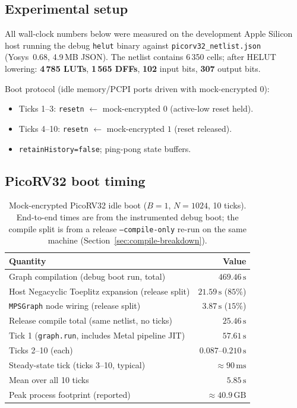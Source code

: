 \documentclass[11pt,a4paper]{article}
\begin{document}
\subsection{Experimental setup}

All wall-clock numbers below were measured on the development Apple Silicon host
running the debug \texttt{helut} binary against
\texttt{picorv32\_netlist.json} (Yosys~0.68, 4.9\,MB JSON).
The netlist contains 6\,350 cells; after HELUT lowering:
\textbf{4\,785 LUTs}, \textbf{1\,565 DFFs}, \textbf{102} input bits,
\textbf{307} output bits.

Boot protocol (idle memory/PCPI ports driven with mock-encrypted 0):
\begin{itemize}[leftmargin=*,itemsep=1pt]
  \item Ticks 1--3: \texttt{resetn} $\leftarrow$ mock-encrypted $0$ (active-low reset held).
  \item Ticks 4--10: \texttt{resetn} $\leftarrow$ mock-encrypted $1$ (reset released).
  \item \texttt{retainHistory=false}; ping-pong state buffers.
\end{itemize}

\subsection{PicoRV32 boot timing}
\label{sec:timing}

\begin{table}[t]
\centering
\caption{Mock-encrypted PicoRV32 idle boot ($B=1$, $N=1024$, 10 ticks).
End-to-end times are from the instrumented debug boot; the compile split is from
a release \texttt{--compile-only} re-run on the same machine
(Section~\ref{sec:compile-breakdown}).}
\label{tab:boot}
\begin{tabular}{@{}lr@{}}
\toprule
\textbf{Quantity} & \textbf{Value} \\
\midrule
Graph compilation (debug boot run, total)
  & $469.46\,\mathrm{s}$ \\
\quad Host Negacyclic Toeplitz expansion (release split)
  & $21.59\,\mathrm{s}$ ($85\%$) \\
\quad \texttt{MPSGraph} node wiring (release split)
  & $3.87\,\mathrm{s}$ ($15\%$) \\
\quad Release compile total (same netlist, no ticks)
  & $25.46\,\mathrm{s}$ \\
Tick 1 (\texttt{graph.run}, includes Metal pipeline JIT)
  & $57.61\,\mathrm{s}$ \\
Ticks 2--10 (each)
  & $0.087$--$0.210\,\mathrm{s}$ \\
Steady-state tick (ticks 3--10, typical)
  & $\approx 90\,\mathrm{ms}$ \\
Mean over all 10 ticks
  & $5.85\,\mathrm{s}$ \\
Peak process footprint (reported)
  & $\approx 40.9\,\mathrm{GB}$ \\
\bottomrule
\end{tabular}
\end{table}
\end{document}
